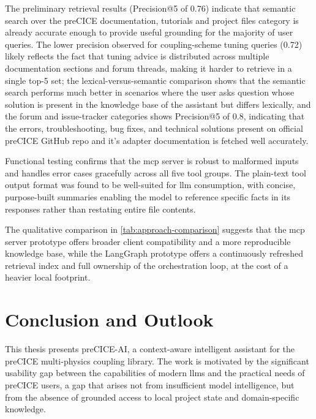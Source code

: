 \documentclass[
  numbers=noenddot,
  english,
  a4paper,
  twoside,
  bibliography=totoc,
  headsepline,
  cleardoublepage=empty,
  parskip=half,
  draft=false
]{scrbook}
\theoremstyle{break}
\renewcommand{\_}{\textunderscore\allowbreak}
\begin{document}
The preliminary retrieval results (Precision@5 of 0.76) indicate that semantic search over the
preCICE documentation, tutorials and project files category is already accurate enough to provide useful grounding for the majority of user queries.
The lower precision observed for coupling-scheme tuning queries (0.72) likely reflects the fact
that tuning advice is distributed across multiple documentation sections and forum threads,
making it harder to retrieve in a single top-5 set; the lexical-versus-semantic
comparison shows that the semantic search performs much better in scenarios where the user asks 
question whose solution is present in the knowledge base of the assistant but differs lexically, and the forum and issue-tracker categories shows Precision@5 of 0.8, indicating that the errors, 
troubleshooting, bug fixes, and technical solutions present on official preCICE GitHub repo and it's adapter documentation is fetched well accurately. 

Functional testing confirms that the \gls{mcp} server is robust to malformed inputs and handles
error cases gracefully across all five tool groups.
The plain-text tool output format was found to be well-suited for \gls{llm} consumption, with
concise, purpose-built summaries enabling the model to reference specific facts in its responses
rather than restating entire file contents.

The qualitative comparison in \cref{tab:approach-comparison} suggests that the \gls{mcp} server
prototype offers broader client compatibility and a more reproducible knowledge base, while the
LangGraph prototype offers a continuously refreshed retrieval index and full ownership of the
orchestration loop, at the cost of a heavier local footprint.


\chapter{Conclusion and Outlook}\label{sec:conclusion}

This thesis presents preCICE-AI, a context-aware intelligent assistant for the preCICE
multi-physics coupling library.
The work is motivated by the significant usability gap between the capabilities of modern
\glspl{llm} and the practical needs of preCICE users, a gap that arises not from insufficient
model intelligence, but from the absence of grounded access to local project state and
domain-specific knowledge.
\end{document}

